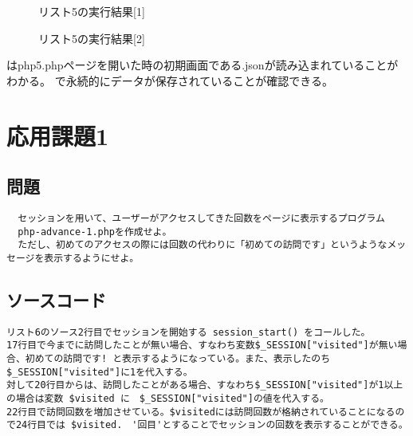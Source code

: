 \documentclass[a4j,10pt]{jsarticle}
\begin{document}
\begin{figure}[H]
  \centering
  \caption{リスト5の実行結果[1]}
\label{fig:fig7}
\end{figure}

\begin{figure}[H]
  \centering
  \caption{リスト5の実行結果[2]}
\label{fig:fig8}
\end{figure}


はphp5.phpページを開いた時の初期画面である.jsonが読み込まれていることがわかる。
で永続的にデータが保存されていることが確認できる。

\newpage

\section{応用課題1}

\subsection{問題}

\begin{verbatim}
  セッションを用いて、ユーザーがアクセスしてきた回数をページに表示するプログラム
  php-advance-1.phpを作成せよ。
  ただし、初めてのアクセスの際には回数の代わりに「初めての訪問です」というようなメッセージを表示するようにせよ。

\end{verbatim}
\subsection{ソースコード}


\begin{verbatim}
リスト6のソース2行目でセッションを開始する session_start() をコールした。
17行目で今までに訪問したことが無い場合、すなわち変数$_SESSION["visited"]が無い場合、初めての訪問です! と表示するようになっている。また、表示したのち$_SESSION["visited"]に1を代入する。
対して20行目からは、訪問したことがある場合、すなわち$_SESSION["visited"]が1以上の場合は変数 $visited に　$_SESSION["visited"]の値を代入する。
22行目で訪問回数を増加させている。$visitedには訪問回数が格納されていることになるので24行目では $visited.　'回目'とすることでセッションの回数を表示することができる。
\end{verbatim}
\end{document}
